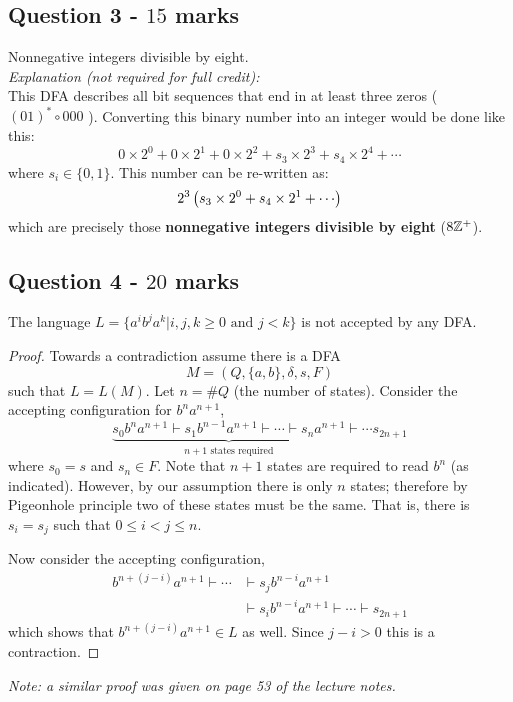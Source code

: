 \documentclass[12pt]{article}
\begin{document}
\subsection*{Question 3 - $15$ marks}
Nonnegative integers divisible by eight.\\

\noindent\small\emph{Explanation (not required for full credit):} \\
This DFA describes all bit sequences that end in at least three zeros ( $(01)^* \circ 000$ ). Converting this binary number into an integer would be done like this: $$0\times2^0 + 0\times 2^1 + 0 \times 2^2 + s_3 \times 2^3 + s_4 \times 2^4 + \cdots$$ where $s_i \in \{0,1\}$. This number can be re-written as:
$$2^3 \brac{s_3 \times 2^0 + s_4 \times 2^1 + \cdots}$$ 
which are precisely those \textbf{nonnegative integers divisible by eight} ($8\mathbb{Z}^{+}$). 

\clearpage
\subsection*{Question 4 - $20$ marks}
The language $L= \{ a^i b^j a^k | i,j,k \geq 0 \text{ and } j < k \}$ is not accepted by any DFA.
\begin{proof}
Towards a contradiction assume there is a DFA $$M=(Q,\{a,b\},\delta,s,F)$$
such that $L=L(M)$. Let $n=\#Q$ (the number of states). Consider the accepting configuration for $b^{n}a^{n+1}$,
$$\underbrace{s_0b^na^{n+1}\vdash s_1 b^{n-1}a^{n+1} \vdash \cdots \vdash s_n a^{n+1}}_{n+1 \text{ states required}} \vdash \cdots s_{2n+1}$$
where $s_0 = s$ and $s_n \in F$. Note that $n+1$ states are required to read $b^n$ (as indicated). However, by our assumption there is only $n$ states; therefore by Pigeonhole principle two of these states must be the same. That is, there is $s_i=s_j$ such that $0 \leq i < j \leq n$.

Now consider the accepting configuration,
\begin{align*}
b^{n+(j-i)}a^{n+1} \vdash \cdots & \vdash s_jb^{n-i}a^{n+1} \\
& \vdash s_i b^{n-i}a^{n+1} \vdash \cdots \vdash s_{2n+1}
\end{align*}
which shows that $b^{n+(j-i)}a^{n+1} \in L$ as well. Since $j-i>0$ this is a contraction.

\end{proof}
\small\emph{Note: a similar proof was given on page 53 of the lecture notes.}
\end{document}
